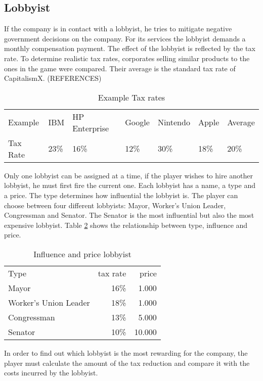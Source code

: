 \subsection{Lobbyist} \label{lobbyist_simulation}
If the company is in contact with a lobbyist, he tries to mitigate negative government decisions on the company. For its services the lobbyist demands a monthly compensation payment. The effect of the lobbyist is reflected by the tax rate. 
To determine realistic tax rates, corporates selling similar products to the ones in the game were compared. Their average is the standard tax rate of CapitalismX. (REFERENCES)

\begin{table}[]
\centering
\begin{tabular}{|l|l|l|l|l|l|l|}
\hline
Example & IBM & HP Enterprise & Google & Nintendo & Apple & Average \\
Tax Rate & 23\% & 16\% & 12\% & 30\% & 18\% & 20\% \\ \hline
\end{tabular}
\caption{Example Tax rates}
\label{Example_Tax}
\end{table}

Only one lobbyist can be assigned at a time, if the player wishes to hire another lobbyist, he must first fire the current one. Each lobbyist has a name, a type and a price. The type determines how influential the lobbyist is. The player can choose between four different lobbyists: Mayor, Worker’s Union Leader, Congressman and Senator. The Senator is the most influential but also the most expensive lobbyist. Table \ref{influence_lobbyist} shows the relationship between type, influence and price. 

\begin{table}[ht]
\centering
\begin{tabular}{|l|r|r|}
\hline
Type                    & tax rate  & price \\
Mayor                   & 16\%      & 1.000     \\
Worker's Union Leader   & 18\%      & 1.000     \\
Congressman             & 13\%      & 5.000     \\
Senator                 & 10\%      & 10.000     \\
\hline
\end{tabular}
\caption{Influence and price lobbyist}
\label{influence_lobbyist}
\end{table}

In order to find out which lobbyist is the most rewarding for the company, the player must calculate the amount of the tax reduction and compare it with the costs incurred by the lobbyist.
 



 




